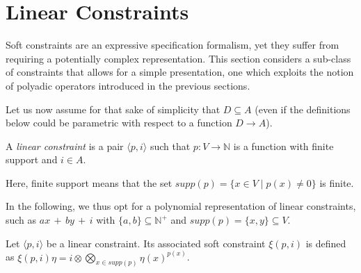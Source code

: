 \documentclass{llncs}
\newcommand{\comment}[1]{}
\def\monop{\otimes}
\begin{document}
%


\comment{
Note also that the diagonal elements are not guaranteed to be $\monop$-compact,
even if they have finite support, since $\top$ is not necessarily so.
%
To this end, we close the section by adding the simple result below to the soft constraint lore.

\begin{proposition}
	Let $c \in \mathbb{C}$ be a constraint. It is $\monop$-compact if and only if it has finite support and 
	$c\eta$ is $\monop$-compact for all $\eta$.
\end{proposition}
}

\section{Linear Constraints}\label{sec:polynomialsoftconstraints}
Soft constraints are an expressive specification formalism, yet they 
suffer from requiring a potentially complex representation.
%
This section considers a sub-class of constraints that allows 
for a simple presentation, one which exploits the notion of
polyadic operators introduced in the previous sections.

Let us now assume for that sake of simplicity that $D \subseteq A$ 
(even if the definitions below could be parametric with respect to
a function $D \rightarrow A$).

\begin{definition}\label{def:softconstraints}
	A \emph{linear constraint} is a pair $\langle p, i \rangle$
	such that $p: V\rightarrow \mathbb{N}$ is a function with 
	finite support and $i\in A$.
\end{definition}
%

Here, finite support means that the set $supp(p) = \{x \in V\mid p(x) \neq 0\}$ is finite.

In the following, we thus opt for a polynomial representation of linear constraints, 
such as $ax \, + \, by \, + \, i$ with $\{a,b\} \subseteq \mathbb{N}^+$ and
$supp(p) = \{x,y\} \subseteq V$.

\begin{definition}\label{def:softconstraints}
	Let $\langle p, i \rangle$ be a linear constraint. Its associated soft constraint
	$\xi(p,i)$ is defined as $\xi(p,i)\eta = i \otimes \bigotimes_{x \in supp(p)} \eta(x)^{p(x)}$.
\end{definition}
\end{document}

